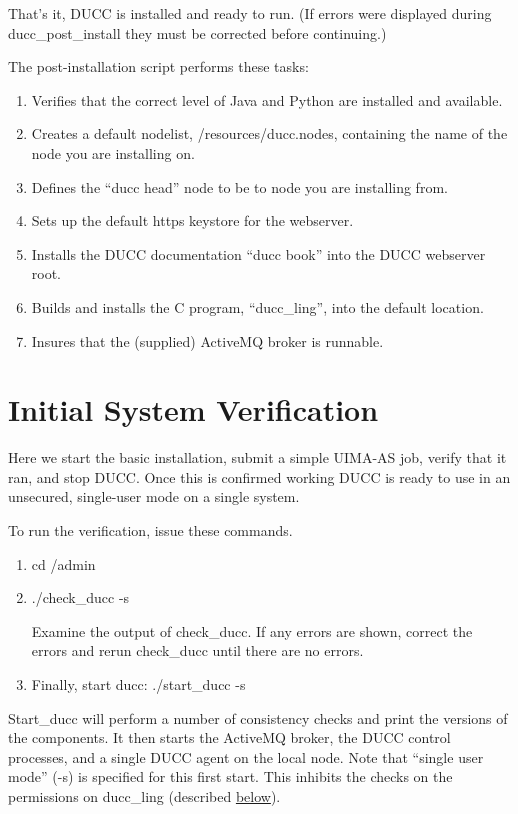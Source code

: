 That's it, DUCC is installed and ready to run. (If errors were displayed during ducc\_post\_install
they must be corrected before continuing.)

The post-installation script performs these tasks:
\begin{enumerate}
    \item Verifies that the correct level of Java and Python are installed and available.
    \item Creates a default nodelist, \duccruntime/resources/ducc.nodes, containing the name of the node you are installing on.
    \item Defines the ``ducc head'' node to be to node you are installing from.
    \item Sets up the default https keystore for the webserver.
    \item Installs the DUCC documentation ``ducc book'' into the DUCC webserver root.
    \item Builds and installs the C program, ``ducc\_ling'', into the default location.
    \item Insures that the (supplied) ActiveMQ broker is runnable.
\end{enumerate}

\section{Initial System Verification}

Here we start the basic installation, submit a simple UIMA-AS job, verify that it ran, and stop
DUCC.  Once this is confirmed working DUCC is ready to use in an unsecured, single-user mode on a
single system.

To run the verification, issue these commands.
\begin{enumerate}
  \item cd \duccruntime/admin 
  \item ./check\_ducc -s
  
    Examine the output of check\_ducc.  If any errors are shown, correct the errors and rerun
    check\_ducc until there are no errors.  
  \item Finally, start ducc: ./start\_ducc -s
  \end{enumerate}
  
  Start\_ducc will perform a number of consistency checks and print the versions of the components.
  It then starts the ActiveMQ broker, the DUCC control processes, and a single DUCC agent on the
  local node.  Note that ``single user mode'' (-s) is specified for this first start.  This inhibits
  the checks on the permissions on ducc\_ling (described \hyperref[sec:duccling]{below}).

